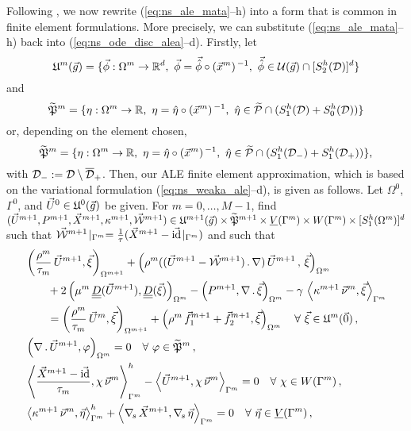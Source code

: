 Following \cite{NobilePhd}, we now rewrite (\ref{eq:ns_ale_mata}--h) into a
form that is common in finite element formulations. More precisely, we can
substitute (\ref{eq:ns_ale_mata}--h) back into (\ref{eq:ns_ode_disc_alea}--d).
Firstly, let
\begin{equation*}
\uspacediscale{g}{m}= \{ \vec\phi: \Omega^m \to \R^d,\
\vec \phi=\vec{\hat\phi}\circ(\vec x^m)^{\,-1},\ \vec{\hat\phi}
\in \mathcal{U}(\vec g) \cap [S^h_2(\D)]^d\}
\end{equation*}
and
\begin{equation*}
\pnormspaceale^m= \{ \eta: \Omega^m\to \R,\
\eta=\hat\eta\circ(\vec x^m)^{\,-1},\ \hat\eta\in\pnormspaceref
\cap (S^h_1(\D) + S^h_0(\D)) \}
\end{equation*}
or, depending on the element chosen,
\begin{equation*}
\pnormspaceale^m= \{ \eta: \Omega^m\to \R,\
\eta=\hat\eta\circ(\vec x^m)^{\,-1},\ \hat\eta\in\pnormspaceref
\cap (S^h_1(\D_-) + S^h_1(\D_+)) \},
\end{equation*}
with $\D_-:=\D\setminus\overline{\D}_+$.
Then, our ALE finite element approximation, which is based on the variational
formulation (\ref{eq:ns_weaka_ale}--d), is given as follows. Let $\Omega^0$,
$\Gamma^0$, and $\vec U^0\in \uspacediscale{g}{0}$ be given. For $m=0,\ldots,
M-1$, find $(\vec U^{m+1},P^{m+1}, \vec X^{m+1}, \kappa^{m+1}, \W^{m+1})
\in \uspacediscale{g}{m+1}\times \pnormspaceale^{m+1} \times \Vh \times \Wh
\times [S^h_1(\Omega^m)]^d$ such that $\W^{m+1}\!\mid_{\Gamma^m} =
\frac1\tau(\vec X^{m+1} - \vec\id\!\mid_{\Gamma^m})$ and such that
\begin{subequations}
\begin{align}
& \left( \frac{\rho^m}{\tau_m}\,\vec U^{m+1}, \vec \xi \right)_{\Omega^{m+1}}
+ \left(\rho^m( (\vec U^{m+1}- \W^{m+1})\,.\,\nabla)\,\vec U^{m+1}\,,
\,\vec \xi \right)_{\Omega^m}\nonumber \\
& \qquad + 2\left(\mu^m\,\mat D(\vec U^{m+1}), \mat D(\vec \xi)
\right)_{\Omega^m} - \left(P^{m+1}, \nabla\,.\,\vec \xi\right)_{\Omega^m}
- \gamma\,\left\langle \kappa^{m+1}\,\vec\nu^m , \vec\xi\right\rangle_{\Gamma^m}
\nonumber \\
& \qquad=  \left(\frac{\rho^m}{\tau_m}\,\vec U^m,\vec \xi \right)_{\Omega^{m+1}}
+ \left(\rho^m\,\vec f_1^{m+1}+\vec f_2^{m+1}, \vec \xi\right)_{\Omega^m}
\quad \forall\ \vec\xi \in \uspacediscale{0}{m}\,, \label{eq:ale_HGa} \\
& \left(\nabla\,.\,\vec U^{m+1}, \varphi\right)_{\Omega^m}  = 0
\quad \forall\ \varphi \in \pnormspaceale^m\,,\label{eq:ale_HGb} \\
&  \left\langle \frac{\vec X^{m+1} - \vec\id}{\tau_m} ,\chi\,\vec\nu^m
\right\rangle_{\Gamma^m}^h - \left\langle \vec U^{m+1}, \chi\,\vec\nu^m
\right\rangle_{\Gamma^m}  = 0 \quad \forall\ \chi \in \Wh\,,
\label{eq:ale_HGc}\\
& \left\langle \kappa^{m+1}\,\vec\nu^m, \vec\eta \right\rangle_{\Gamma^m}^h
+ \left\langle \nabs\,\vec X^{m+1}, \nabs\,\vec \eta \right\rangle_{\Gamma^m} =
0 \quad \forall\ \vec\eta \in \Vh\,, \label{eq:ale_HGd}
\end{align}
\end{subequations}

